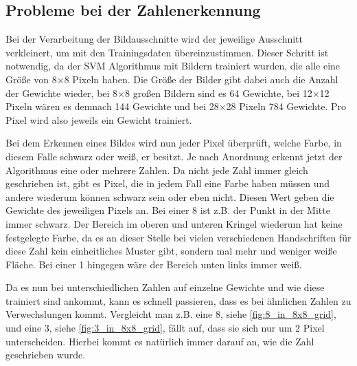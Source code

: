 \subsection{Probleme bei der Zahlenerkennung}\label{sec:problem_number_detection}
Bei der Verarbeitung der Bildausschnitte wird der jeweilige Ausschnitt verkleinert, um mit den Trainingsdaten übereinzustimmen. Dieser Schritt ist notwendig, da der SVM Algorithmus mit Bildern trainiert wurden, die alle eine Größe von 8×8 Pixeln haben. Die Größe der Bilder gibt dabei auch die Anzahl der Gewichte wieder, bei 8×8 großen Bildern sind es 64 Gewichte, bei 12×12 Pixeln wären es demnach 144 Gewichte und bei 28×28 Pixeln 784 Gewichte. Pro Pixel wird also jeweils ein Gewicht trainiert.\par
Bei dem Erkennen eines Bildes wird nun jeder Pixel überprüft, welche Farbe, in diesem Falle schwarz oder weiß, er besitzt. Je nach Anordnung erkennt jetzt der Algorithmus eine oder mehrere Zahlen. Da nicht jede Zahl immer gleich geschrieben ist, gibt es Pixel, die in jedem Fall eine Farbe haben müssen und andere wiederum können schwarz sein oder eben nicht. Diesen Wert geben die Gewichte des jeweiligen Pixels an. Bei einer 8 ist z.B. der Punkt in der Mitte immer schwarz. Der Bereich im oberen und unteren Kringel wiederum hat keine festgelegte Farbe, da es an dieser Stelle bei vielen verschiedenen Handschriften für diese Zahl kein einheitliches Muster gibt, sondern mal mehr und weniger weiße Fläche. Bei einer 1 hingegen wäre der Bereich unten links immer weiß. \par
Da es nun bei unterschiedlichen Zahlen auf einzelne Gewichte und wie diese trainiert sind ankommt, kann es schnell passieren, dass es bei ähnlichen Zahlen zu Verwechslungen kommt. Vergleicht man z.B. eine 8, siehe \ref{fig:8_in_8x8_grid}, und eine 3, siehe \ref{fig:3_in_8x8_grid}, fällt  auf, dass sie sich nur um 2 Pixel unterscheiden. Hierbei kommt es natürlich immer darauf an, wie die Zahl geschrieben wurde.\par
